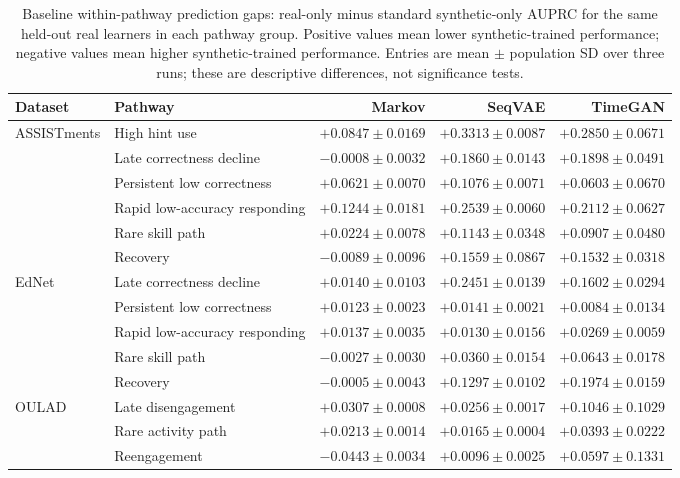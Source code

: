 \begin{table}[!htbp]
\centering
\caption{Baseline within-pathway prediction gaps: real-only minus standard synthetic-only AUPRC for the same held-out real learners in each pathway group. Positive values mean lower synthetic-trained performance; negative values mean higher synthetic-trained performance. Entries are mean $\pm$ population SD over three runs; these are descriptive differences, not significance tests.}
\label{tab:within-pathway-gaps}
\small
\setlength{\tabcolsep}{4pt}
\begin{tabular}{@{}llrrr@{}}
\toprule
Dataset & Pathway & Markov & SeqVAE & TimeGAN \\
\midrule
ASSISTments & High hint use & $+0.0847\pm0.0169$ & $+0.3313\pm0.0087$ & $+0.2850\pm0.0671$ \\
 & Late correctness decline & $-0.0008\pm0.0032$ & $+0.1860\pm0.0143$ & $+0.1898\pm0.0491$ \\
 & Persistent low correctness & $+0.0621\pm0.0070$ & $+0.1076\pm0.0071$ & $+0.0603\pm0.0670$ \\
 & Rapid low-accuracy responding & $+0.1244\pm0.0181$ & $+0.2539\pm0.0060$ & $+0.2112\pm0.0627$ \\
 & Rare skill path & $+0.0224\pm0.0078$ & $+0.1143\pm0.0348$ & $+0.0907\pm0.0480$ \\
 & Recovery & $-0.0089\pm0.0096$ & $+0.1559\pm0.0867$ & $+0.1532\pm0.0318$ \\
\addlinespace
EdNet & Late correctness decline & $+0.0140\pm0.0103$ & $+0.2451\pm0.0139$ & $+0.1602\pm0.0294$ \\
 & Persistent low correctness & $+0.0123\pm0.0023$ & $+0.0141\pm0.0021$ & $+0.0084\pm0.0134$ \\
 & Rapid low-accuracy responding & $+0.0137\pm0.0035$ & $+0.0130\pm0.0156$ & $+0.0269\pm0.0059$ \\
 & Rare skill path & $-0.0027\pm0.0030$ & $+0.0360\pm0.0154$ & $+0.0643\pm0.0178$ \\
 & Recovery & $-0.0005\pm0.0043$ & $+0.1297\pm0.0102$ & $+0.1974\pm0.0159$ \\
\addlinespace
OULAD & Late disengagement & $+0.0307\pm0.0008$ & $+0.0256\pm0.0017$ & $+0.1046\pm0.1029$ \\
 & Rare activity path & $+0.0213\pm0.0014$ & $+0.0165\pm0.0004$ & $+0.0393\pm0.0222$ \\
 & Reengagement & $-0.0443\pm0.0034$ & $+0.0096\pm0.0025$ & $+0.0597\pm0.1331$ \\
\bottomrule
\end{tabular}
\end{table}
